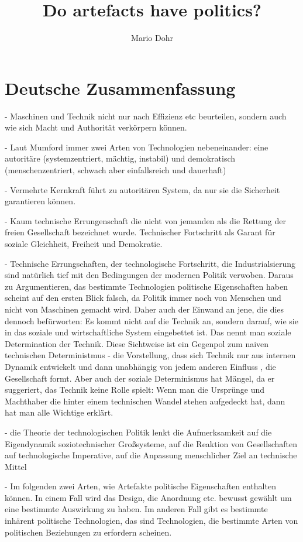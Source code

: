 \documentclass[10pt,a4paper]{article}
\author{Mario Dohr}
\title{Do artefacts have politics?}
\begin{document}
\maketitle
\section{Deutsche Zusammenfassung}
- Maschinen und Technik nicht nur nach Effizienz etc beurteilen, sondern auch wie sich Macht und Authorität verkörpern können.

- Laut Mumford immer zwei Arten von Technologien nebeneinander: eine autoritäre (systemzentriert, mächtig, instabil) und demokratisch (menschenzentriert, schwach aber einfallsreich und dauerhaft)

- Vermehrte Kernkraft führt zu autoritären System, da nur sie die Sicherheit garantieren können.

- Kaum technische Errungenschaft die nicht von jemanden als die Rettung der freien Gesellschaft bezeichnet wurde. 
Technischer Fortschritt als Garant für soziale Gleichheit, Freiheit und Demokratie.

- Technische Errungschaften, der technologische Fortschritt, die Industrialsierung sind natürlich tief mit den Bedingungen der modernen Politik verwoben. Daraus zu Argumentieren, das bestimmte Technologien politische Eigenschaften haben scheint auf den ersten Blick falsch, da Politik immer noch von Menschen und nicht von Maschinen gemacht wird. Daher auch der Einwand an jene, die dies dennoch befürworten: Es kommt nicht auf die Technik an, sondern darauf, wie sie in das soziale und wirtschaftliche System eingebettet ist. Das nennt man soziale Determination der Technik. Diese Sichtweise ist ein Gegenpol zum naiven technischen Deterministmus - die Vorstellung, dass sich Technik nur aus internen Dynamik entwickelt und dann unabhängig von jedem anderen Einfluss , die Gesellschaft formt. 
Aber auch der soziale Determinismus hat Mängel, da er suggeriert, das Technik keine Rolle spielt: Wenn man die Ursprünge und Machthaber die hinter einem technischen Wandel stehen aufgedeckt hat, dann hat man alle Wichtige erklärt. 

- die Theorie der technologischen Politik lenkt die Aufmerksamkeit auf die Eigendynamik soziotechnischer Großsysteme, auf die Reaktion von Gesellschaften auf technologische Imperative, auf die Anpassung menschlicher Ziel an technische Mittel

- Im folgenden zwei Arten, wie Artefakte politische Eigenschaften enthalten können. In einem Fall wird das Design, die Anordnung etc. bewusst gewählt um eine bestimmte Auswirkung zu haben. Im anderen Fall gibt es bestimmte inhärent politische Technologien, das sind Technologien, die bestimmte Arten von politischen Beziehungen zu erfordern scheinen.
\end{document}
